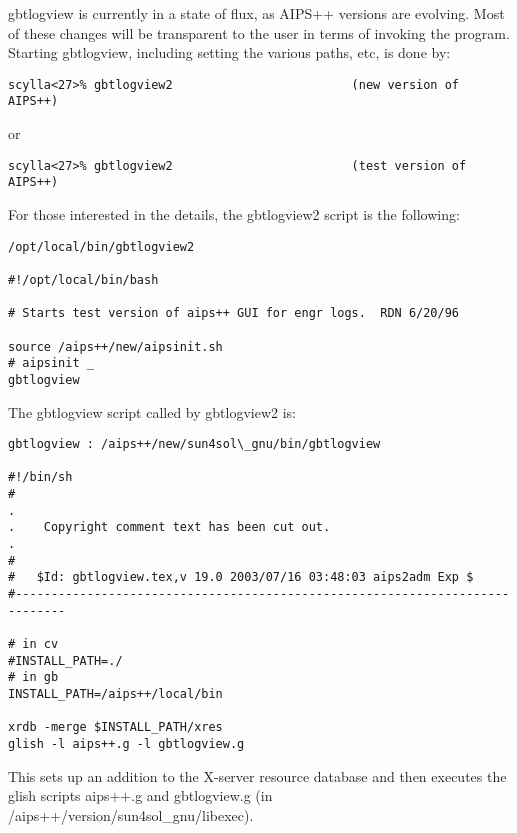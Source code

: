 gbtlogview is currently in a state of flux, as AIPS++ versions are evolving.
Most of these changes will be transparent to the user in terms of invoking
the program. Starting gbtlogview, including setting the various paths, etc,
is done by:

\begin{verbatim}
scylla<27>% gbtlogview2                         (new version of AIPS++)
\end{verbatim}

or

\begin{verbatim}
scylla<27>% gbtlogview2                         (test version of AIPS++)
\end{verbatim}

For those interested in the details, the gbtlogview2 script is the following:

\begin{verbatim}
/opt/local/bin/gbtlogview2

#!/opt/local/bin/bash
 
# Starts test version of aips++ GUI for engr logs.  RDN 6/20/96
 
source /aips++/new/aipsinit.sh
# aipsinit _
gbtlogview
\end{verbatim}

The gbtlogview script called by gbtlogview2 is:

\begin{verbatim}
gbtlogview : /aips++/new/sun4sol\_gnu/bin/gbtlogview

#!/bin/sh
#
.
.    Copyright comment text has been cut out.
.
#
#   $Id: gbtlogview.tex,v 19.0 2003/07/16 03:48:03 aips2adm Exp $
#-----------------------------------------------------------------------------

# in cv
#INSTALL_PATH=./
# in gb
INSTALL_PATH=/aips++/local/bin

xrdb -merge $INSTALL_PATH/xres
glish -l aips++.g -l gbtlogview.g
\end{verbatim}

This sets up an addition to the X-server resource database and then executes
the glish scripts aips++.g and  gbtlogview.g 
(in /aips++/version/sun4sol\_gnu/libexec).



